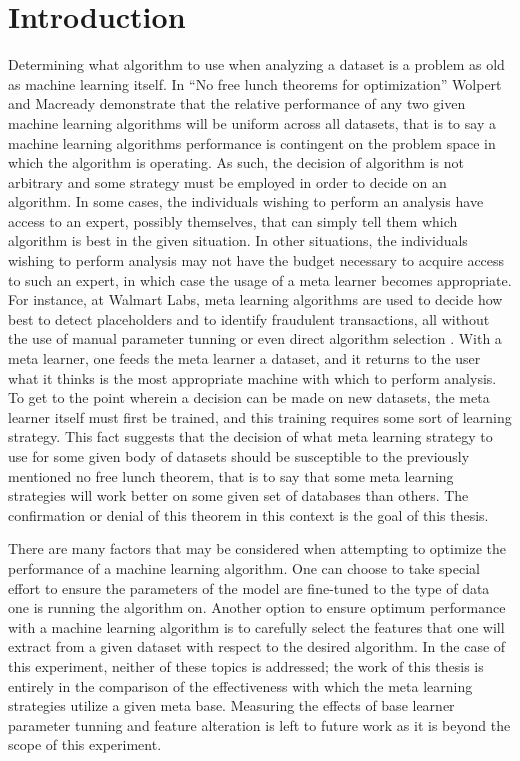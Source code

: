 \chapter{Introduction}
\label{Introduction}
Determining what algorithm to use when analyzing a dataset is a problem as
old as machine learning itself. In ``No free lunch theorems for optimization''
Wolpert and Macready demonstrate that the relative performance of any two given
machine learning algorithms will be uniform across all datasets, that is to say
a machine learning algorithms performance is contingent on the problem space in
which the algorithm is operating. As such, the decision of algorithm is not
arbitrary and some strategy must be employed in order to decide
on an algorithm. In some cases, the individuals wishing to perform an analysis
have access to an expert, possibly themselves, that can simply tell them which
algorithm is best in the given situation. In other situations, the individuals
wishing to perform analysis may not have the budget necessary to acquire access
to such an expert, in which case the usage of a meta learner becomes appropriate.
For instance, at Walmart Labs, meta learning algorithms are used to decide how
best to detect placeholders and to identify fraudulent transactions, all without
the use of manual parameter tunning or even direct algorithm selection \cite{Gupta}.
With a meta learner, one feeds the meta learner a dataset, and it returns to the
user what it thinks is the most appropriate machine with which to perform
analysis. To get to the point wherein a decision can be made on new datasets, the
meta learner itself must first be trained, and this training requires some
sort of learning strategy. This fact suggests that the decision of what
meta learning strategy to use for some given body of datasets should be
susceptible to the previously mentioned no free lunch theorem, that is to say
that some meta learning strategies will work better on some given set of
databases than others. The confirmation or denial of this theorem in this
context is the goal of this thesis.

There are many factors that may be considered when attempting to optimize
the performance of a machine learning algorithm. One can choose to take special
effort to ensure the parameters of the model are fine-tuned to the type of data
one is running the algorithm on. Another option to ensure optimum performance
with a machine learning algorithm is to carefully select the features that
one will extract from a given dataset with respect to the desired algorithm.
In the case of this experiment, neither of these topics is addressed; the work
of this thesis is entirely in the comparison of the effectiveness with which
the meta learning strategies utilize a given meta base. Measuring the effects of
base learner parameter tunning and feature alteration is left to future work as
it is beyond the scope of this experiment.

